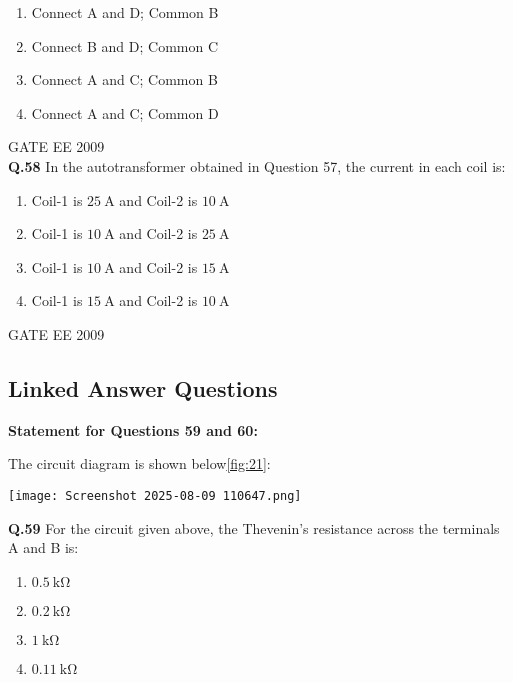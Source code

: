 \documentclass[12pt]{article}
\begin{document}
\begin{enumerate}
\item Connect A and D; Common B 
\item Connect B and D; Common C 
\item  Connect A and C; Common B 
\item  Connect A and C; Common D
\end{enumerate}

\vspace{0.7cm}
\hspace{10pt}
GATE EE 2009\\
\textbf{Q.58}  
In the autotransformer obtained in Question 57, the current in each coil is:

\begin{enumerate}
    
\item  Coil-1 is \(25 \ \mathrm{A}\) and Coil-2 is \(10 \ \mathrm{A}\) 
\item  Coil-1 is \(10 \ \mathrm{A}\) and Coil-2 is \(25 \ \mathrm{A}\) 
\item  Coil-1 is \(10 \ \mathrm{A}\) and Coil-2 is \(15 \ \mathrm{A}\) 
\item Coil-1 is \(15 \ \mathrm{A}\) and Coil-2 is \(10 \ \mathrm{A}\)
\end{enumerate}

\hspace{10pt}
GATE EE 2009\\
\subsection*{Linked Answer Questions}

\textbf{Statement for Questions 59 and 60:}

The circuit diagram is shown below\ref{fig:21}:

\begin{center}
\texttt{[image: Screenshot 2025-08-09 110647.png]}
\label{fig:21}
\end{center}

\vspace{0.5cm}

\textbf{Q.59} For the circuit given above, the Thevenin's resistance across the terminals A and B is:

\begin{enumerate}
    

\item \(0.5 \ \mathrm{k\Omega}\) 
\item  \(0.2 \ \mathrm{k\Omega}\) 
\item  \(1 \ \mathrm{k\Omega}\) 
\item  \(0.11 \ \mathrm{k\Omega}\)
\end{enumerate}
\end{document}
